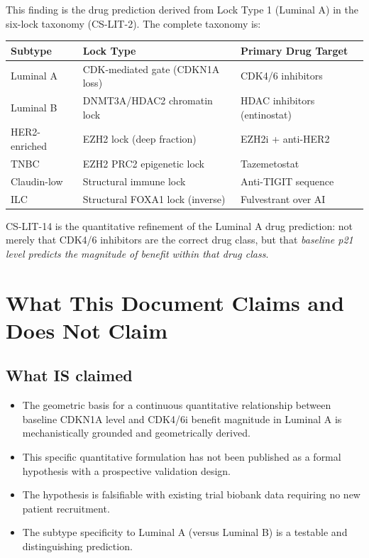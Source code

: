 \documentclass[12pt, a4paper]{article}
\begin{document}
This finding is the drug prediction derived from
Lock Type 1 (Luminal A) in the six-lock taxonomy
(CS-LIT-2). The complete taxonomy is:

\begin{center}
\begin{tabular}{lll}
\toprule
\textbf{Subtype} & \textbf{Lock Type} &
\textbf{Primary Drug Target} \\
\midrule
Luminal A & CDK-mediated gate (CDKN1A loss) &
CDK4/6 inhibitors \\
Luminal B & DNMT3A/HDAC2 chromatin lock &
HDAC inhibitors (entinostat) \\
HER2-enriched & EZH2 lock (deep fraction) &
EZH2i + anti-HER2 \\
TNBC & EZH2 PRC2 epigenetic lock &
Tazemetostat \\
Claudin-low & Structural immune lock &
Anti-TIGIT sequence \\
ILC & Structural FOXA1 lock (inverse) &
Fulvestrant over AI \\
\bottomrule
\end{tabular}
\end{center}

\vspace{0.5em}

CS-LIT-14 is the quantitative refinement of the
Luminal A drug prediction: not merely that CDK4/6
inhibitors are the correct drug class, but that
\emph{baseline p21 level predicts the magnitude of
benefit within that drug class}.

\section{What This Document Claims and Does Not Claim}

\subsection{What IS claimed}

\begin{itemize}
    \item The geometric basis for a continuous
    quantitative relationship between baseline CDKN1A
    level and CDK4/6i benefit magnitude in Luminal A
    is mechanistically grounded and geometrically derived.
    \item This specific quantitative formulation has not
    been published as a formal hypothesis with a
    prospective validation design.
    \item The hypothesis is falsifiable with existing
    trial biobank data requiring no new patient
    recruitment.
    \item The subtype specificity to Luminal A
    (versus Luminal B) is a testable and distinguishing
    prediction.
\end{itemize}
\end{document}
